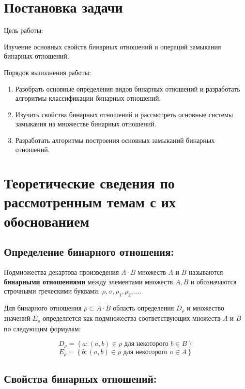 \documentclass[spec, och, labwork]{shiza}
\begin{document}
\tableofcontents

\section{Постановка задачи}

Цель работы:

Изучение основных свойств бинарных отношений и операций замыкания бинарных отношений.

Порядок выполнения работы:
    \begin{enumerate}
        \item Разобрать основные определения видов бинарных отношений и разработать
        алгоритмы классификации бинарных отношений.
        \item Изучить свойства бинарных отношений и рассмотреть основные системы
        замыкания на множестве бинарных отношений.
        \item Разработать алгоритмы построения основных замыканий бинарных отношений.
    \end{enumerate}

\section{Теоретические сведения по рассмотренным темам с их обоснованием}

\subsection{Определение бинарного отношения:}
        
        Подмножества декартова произведения $A \cdot B$ множеств $A$ и $B$ называются \textbf{бинарными отношениями} между элементами множеств $A, B$ и обозначаются строчными греческими буквами: $\rho, \sigma, \rho_1, \rho_2, ...$. 

        Для бинарного отношения $\rho \subset A \cdot B$ область определения $D_\rho$ и множество значений $E_\rho$ определяется как подмножества соответствующих множеств $A$ и $B$ по следующим формулам:

        \[D_\rho = \left\{ a: (a, b) \in \rho \text{ для некоторого } b \in B \right\}\]
        \[E_\rho = \left\{ b: (a, b) \in \rho \text{ для некоторого } a \in A \right\}\]

\subsection{Свойства бинарных отношений:}
\end{document}
